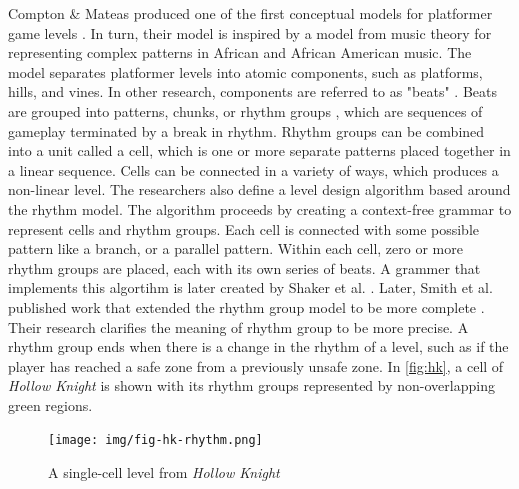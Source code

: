 Compton & Mateas produced one of the first conceptual models for platformer game levels
\cite{compton2006}. In turn, their model is inspired by a model from music theory for
representing complex patterns in African and African American music. The model separates
platformer levels into atomic components, such as platforms, hills, and vines. In other
research, components are referred to as "beats" \cite{dahlskog2012, smith2008}. Beats are
grouped into patterns, chunks, or rhythm groups \cite{dahlskog2012}, which are sequences of
gameplay terminated by a break in rhythm. Rhythm groups can be combined into a unit called a
cell, which is one or more separate patterns placed together in a linear sequence. Cells can
be connected in a variety of ways, which produces a non-linear level. The researchers also
define a level design algorithm based around the rhythm model. The algorithm proceeds by
creating a context-free grammar to represent cells and rhythm groups. Each cell is connected
with some possible pattern like a branch, or a parallel pattern. Within each cell, zero or
more rhythm groups are placed, each with its own series of beats. A grammer that implements
this algortihm is later created by Shaker et al. \cite{shaker2012}. Later, Smith et al.
published work that extended the rhythm group model to be more complete \cite{smith2008}.
Their research clarifies the meaning of rhythm group to be more precise. A rhythm group ends
when there is a change in the rhythm of a level, such as if the player has reached a safe
zone from a previously unsafe zone. In \autoref{fig:hk}, a cell of \emph{Hollow Knight} is
shown with its rhythm groups represented by non-overlapping green regions.

\begin{figure}[h]
    \texttt{[image: img/fig-hk-rhythm.png]}
    \caption{A single-cell level from \emph{Hollow Knight}}
    \label{fig:hk}
\end{figure}

